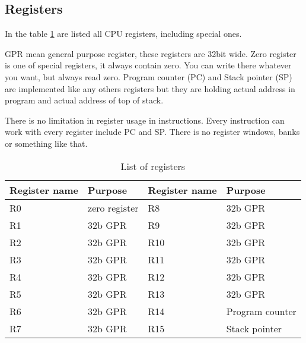 \subsection{Registers}

In the table \ref{tab:registers_list} are listed all CPU registers, including
special ones.

GPR mean general purpose register, these registers are 32bit wide.
Zero register is one of special registers, it always contain zero.
You can write there whatever you want, but always read zero. Program
counter (PC) and Stack pointer (SP) are implemented like any others
registers but they are holding actual address in program and actual
address of top of stack.

There is no limitation in register usage in instructions. Every
instruction can work with every register include PC and SP. There is
no register windows, banks or something like that.

\begin{table}[h]
    \centering
    \begin{tabular}{|l|l|l|l|}
        \hline
        \textbf{Register name} & \textbf{Purpose} & \textbf{Register name} & \textbf{Purpose} \\ \hline
        R0                     & zero register    & R8                     & 32b GPR          \\ \hline
        R1                     & 32b GPR          & R9                     & 32b GPR          \\ \hline
        R2                     & 32b GPR          & R10                    & 32b GPR          \\ \hline
        R3                     & 32b GPR          & R11                    & 32b GPR          \\ \hline
        R4                     & 32b GPR          & R12                    & 32b GPR          \\ \hline
        R5                     & 32b GPR          & R13                    & 32b GPR          \\ \hline
        R6                     & 32b GPR          & R14                    & Program counter  \\ \hline
        R7                     & 32b GPR          & R15                    & Stack pointer    \\ \hline
    \end{tabular}
    \caption{List of registers}
    \label{tab:registers_list}
\end{table}


